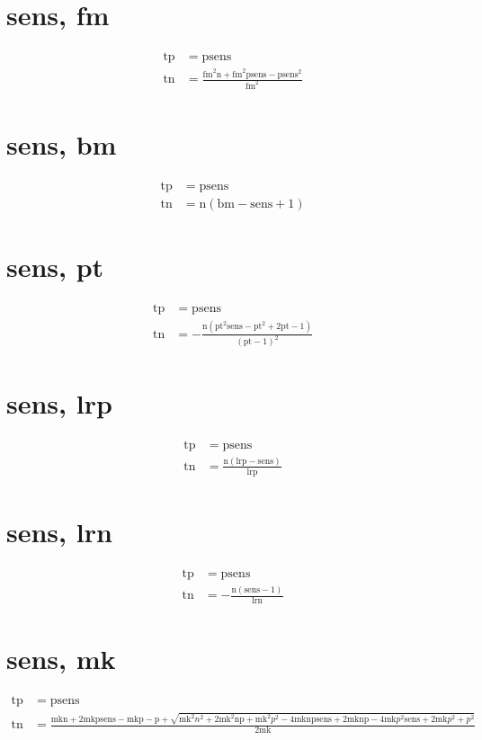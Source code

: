 \documentclass[3p,times]{elsarticle}
\begin{document}
\begin{footnotesize}
\begin{landscape}
\section{sens, fm}
\begin{align}
\mathrm{tp} &= \mathrm{p} \mathrm{sens}\\
\mathrm{tn} &= \frac{\mathrm{fm}^{2} \mathrm{n} + \mathrm{fm}^{2} \mathrm{p} \mathrm{sens} - \mathrm{p} \mathrm{sens}^{2}}{\mathrm{fm}^{2}}
\end{align}
\section{sens, bm}
\begin{align}
\mathrm{tp} &= \mathrm{p} \mathrm{sens}\\
\mathrm{tn} &= \mathrm{n} \left(\mathrm{bm} - \mathrm{sens} + 1\right)
\end{align}
\section{sens, pt}
\begin{align}
\mathrm{tp} &= \mathrm{p} \mathrm{sens}\\
\mathrm{tn} &= - \frac{\mathrm{n} \left(\mathrm{pt}^{2} \mathrm{sens} - \mathrm{pt}^{2} + 2 \mathrm{pt} - 1\right)}{\left(\mathrm{pt} - 1\right)^{2}}
\end{align}
\section{sens, lrp}
\begin{align}
\mathrm{tp} &= \mathrm{p} \mathrm{sens}\\
\mathrm{tn} &= \frac{\mathrm{n} \left(\mathrm{lrp} - \mathrm{sens}\right)}{\mathrm{lrp}}
\end{align}
\section{sens, lrn}
\begin{align}
\mathrm{tp} &= \mathrm{p} \mathrm{sens}\\
\mathrm{tn} &= - \frac{\mathrm{n} \left(\mathrm{sens} - 1\right)}{\mathrm{lrn}}
\end{align}
\section{sens, mk}
\begin{align}
\mathrm{tp} &= \mathrm{p} \mathrm{sens}\\
\mathrm{tn} &= \frac{\mathrm{mk} \mathrm{n} + 2 \mathrm{mk} \mathrm{p} \mathrm{sens} - \mathrm{mk} \mathrm{p} - \mathrm{p} + \sqrt{\mathrm{mk}^{2} n^{2} + 2 \mathrm{mk}^{2} \mathrm{n} \mathrm{p} + \mathrm{mk}^{2} p^{2} - 4 \mathrm{mk} \mathrm{n} \mathrm{p} \mathrm{sens} + 2 \mathrm{mk} \mathrm{n} \mathrm{p} - 4 \mathrm{mk} p^{2} \mathrm{sens} + 2 \mathrm{mk} p^{2} + p^{2}}}{2 \mathrm{mk}}
\end{align}

\end{landscape}
\end{footnotesize}
\end{document}
